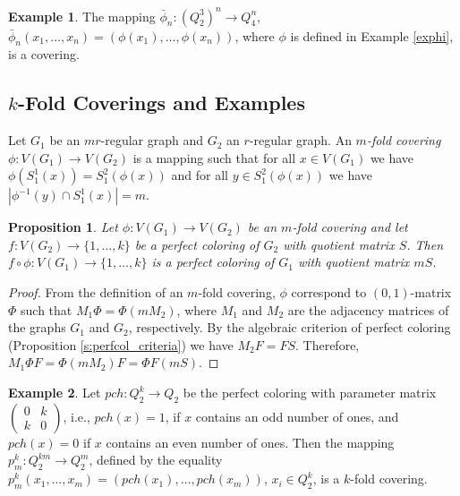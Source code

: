\documentclass[11pt]{article}
\newtheorem{claim}{Proposition}[section]
\theoremstyle{definition}
\newtheorem{example}{Example}[section]
\begin{document}
\begin{example}\label{exBesp} %
The mapping $\bar\phi_n :({Q}^{3}_2)^n
\rightarrow {Q}^n_4$, $\bar\phi_n(x_1,\dots,x_n)=(\phi(x_1),\dots,\phi(x_n))$, where
$\phi$ is defined in Example \ref{exphi}, is a covering.
\end{example}

\subsection{$k$-Fold Coverings and Examples}


Let $G_1$ be an $mr$-regular graph and $G_2$ an $r$-regular graph.
An {\sl $m$-fold covering} $\phi: V(G_1)\rightarrow V(G_2)$ is a mapping
such that for all $ x\in V(G_1)$ we have $\phi(S^1_1(x))=S^2_1(\phi(x))$
and  for all $ y\in S^2_1(\phi(x))$ we have  $|\phi^{-1}(y)\cap S^1_1(x)|=m$.


\begin{claim}
Let $\phi: V(G_1)\rightarrow V(G_2)$ be an $m$-fold covering and let
$f: V(G_2)\rightarrow \{1,\ldots,k\}$ be a perfect coloring of $G_2$ with quotient matrix
$S$.
Then $f\circ\phi: V(G_1)\rightarrow\{1,\ldots,k\}$ is a perfect coloring of $G_1$ with quotient matrix
$mS$.
\end{claim}
\begin{proof}
From the definition of an $m$-fold covering,  $\phi$ correspond to  
 $(0,1)$-matrix $\Phi$ such that  $M_1\Phi=\Phi(mM_2)$, where $M_1$ and $M_2$
are the adjacency matrices of the graphs $G_1$ and $G_2$, respectively. By the algebraic criterion of perfect coloring (Proposition \ref{s:perfcol_criteria}) we have $M_2F=FS$.
Therefore, $M_1\Phi F=\Phi(mM_2)F=\Phi F(mS)$.
\end{proof}

\begin{example}\label{ex:pch}
Let $pch:Q^k_2\rightarrow Q_2$ be the
 perfect coloring with parameter matrix $
\begin{pmatrix}
0 & k \\
k & 0
\end{pmatrix}$, i.e., $pch(x)=1$,
if $x$ contains an odd number of ones, and $pch(x)=0$ if $x$
contains an even number of ones. Then the mapping
$p_m^k:Q^{km}_2\rightarrow Q_2^m$, defined by the equality
$p_m^k(x_1,\dots,x_m)=(pch(x_1),\dots,pch(x_m))$, $x_i\in Q^k_2$,
is a $k$-fold covering.
\end{example}
\end{document}
